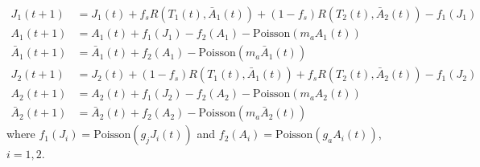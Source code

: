 \documentclass[12pt, table]{article}
\begin{document}
 \begin{align}
 J_1(t+1)&=  J_1(t)+f_sR(T_1(t), \bar{A}_1(t))+(1-f_s)R(T_2(t), \bar{A}_2(t))-f_1(J_1)\nonumber\\  
 A_1(t+1)&=  A_1(t)+f_1(J_1)-f_2(A_1)-\text{Poisson$\left(m_aA_1(t)\right)$}\\  
 \bar{A}_1(t+1)&=  \bar{A}_1(t)+f_2(A_1)-\text{Poisson$\left(m_a\bar{A}_1(t)\right)$}\nonumber\\
 J_2(t+1)&=  J_2(t)+(1-f_s)R(T_1(t), \bar{A}_1(t))+f_sR(T_2(t), \bar{A}_2(t))-f_1(J_2)\nonumber\\  
 A_2(t+1)&=  A_2(t)+f_1(J_2)-f_2(A_2)-\text{Poisson$\left(m_aA_2(t)\right)$}\nonumber\\  
 \bar{A}_2(t+1)&=  \bar{A}_2(t)+f_2(A_2)-\text{Poisson$\left(m_a\bar{A}_2(t)\right)$}\nonumber
\end{align}
where $f_1(J_i)=\text{Poisson$\left(g_jJ_i(t)\right)$}$ and  $f_2(A_i)=\text{Poisson$\left(g_aA_i(t)\right)$}$, $i=1,2.$
\end{document}
